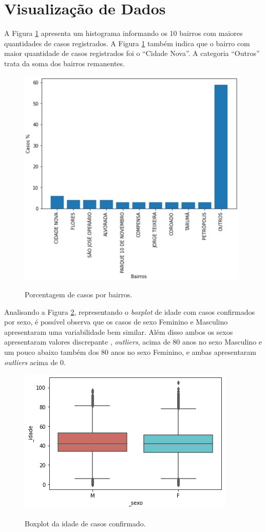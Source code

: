 \documentclass[12pt]{article}
\begin{document}
\section{Visualização de Dados}
A Figura \ref{fig:seção_2.2_questão_1} apresenta um histograma informando os 10 bairros com maiores quantidades de casos registrados. A Figura \ref{fig:seção_2.2_questão_1} também indica que o bairro com maior quantidade de casos registrados foi o ``Cidade Nova''. A categoria ``Outros'' trata da soma dos bairros remanentes.

\begin{figure}[!ht]
  \centering
    \includegraphics[width=.5\linewidth]{Figuras/porcentagem_de_casos_por_bairros.png} \\
  \caption{Porcentagem de casos por bairros.}
  \label{fig:seção_2.2_questão_1}
\end{figure}

Analisando a Figura \ref{fig:seção_2.2_questão_2}, representando o \textit{boxplot} de idade com casos confirmados por sexo, é possível observa que os casos de sexo Feminino e Masculino apresentaram uma variabilidade bem similar. Além disso ambos os sexos apresentaram valores discrepante , \textit{outliers}, acima de 80 anos no sexo Masculino e um pouco abaixo também dos 80 anos no sexo Feminino, e ambas apresentaram \textit{outliers} acima de 0.

\begin{figure}[!ht]
  \centering
    \includegraphics[width=.5\linewidth]{Figuras/boxplot_sexo_idade.png} \\
  \caption{Boxplot da idade de casos confirmado.}
  \label{fig:seção_2.2_questão_2}
\end{figure}
\end{document}
